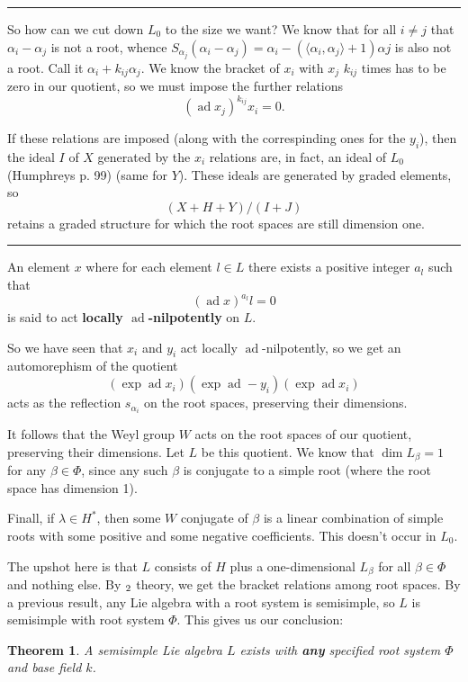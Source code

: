 \documentclass[12pt]{article}
\theoremstyle{nonumberbreak}
\theoremstyle{changebreak}
\newtheorem{thm}{Theorem}[subsection]
\theoremstyle{nonumberbreak}
\theoremstyle{change}
\newcommand*{\brk}{
\rule{2in}{.1pt}
}
\let\sl\relax
\DeclareMathOperator{\sl}{\mathfrak{sl}}
\DeclareMathOperator{\ad}{ad}
\begin{document}
\brk

So how can we cut down $L_0$ to the size we want? We know that for all $i\ne j$ that $\alpha_i-\alpha_j$ is not a root,
whence $S_{\alpha_j}(\alpha_i-\alpha_j)=\alpha_i-(\langle\alpha_i,\alpha_j\rangle+1)\alpha j$
is also not a root. Call it $\alpha_i+k_{ij}\alpha_j$. We know the bracket of $x_i$ with $x_j$ $k_{ij}$ times has to be zero in our quotient, so
we must impose the further relations
\[(\ad x_j)^{k_{ij}}x_i=0.\]

If these relations are imposed (along with the correspinding ones for the $y_i$), then the ideal $I$ of $X$ generated by the $x_i$ relations are, in
fact, an ideal of $L_0$ (Humphreys p. 99) (same for $Y$). These ideals are generated by graded elements, so
\[(X+H+Y)/(I+J)\]
retains a graded structure for which the root spaces are still dimension one.

\brk

\begin{defn}
	An element $x$ where for each element $l\in L$ there exists a positive integer $a_l$ such that
	\[(\ad x)^{a_l}l=0\]
	is said to act \textbf{locally $\ad$-nilpotently} on $L$.
\end{defn}
So we have seen that $x_i$ and $y_i$ act locally $\ad$-nilpotently, so we get an automorephism of the quotient
\[(\exp\ad x_i)(\exp \ad -y_i)(\exp\ad x_i)\]
acts as the reflection $s_{\alpha_i}$ on the root spaces, preserving their dimensions.

It follows that the Weyl group $W$ acts on the root spaces of our quotient, preserving their dimensions.
Let $L$ be this quotient. We know that $\dim L_\beta=1$ for any $\beta\in\Phi$, since any such $\beta$ is 
conjugate to a simple root (where the root space has dimension 1).

Finall, if $\lambda\in H^*$, then some $W$ conjugate of $\beta$ is a linear combination of simple roots
with some positive and some negative coefficients. This doesn't occur in $L_0$.

The upshot here is that $L$ consists of $H$ plus a one-dimensional $L_\beta$ for all $\beta\in\Phi$ and 
nothing else. By $\sl_2$ theory, we get the bracket relations among root spaces. By a previous result, any Lie algebra with a root 
system is semisimple, so $L$ is semisimple with root system $\Phi$. This gives us our conclusion:
\begin{thm}
	A semisimple Lie algebra $L$ exists with \textbf{any} specified root system $\Phi$ and base
	field $k$.
\end{thm}
\end{document}
